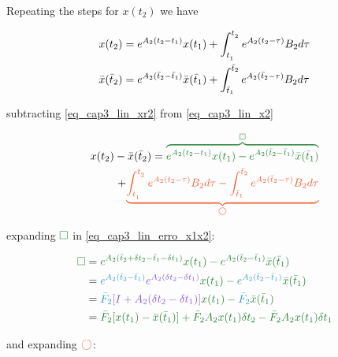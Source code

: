 
Repeating the steps for $x(t_2)$ we have


\noindent
\begin{align}
	\label{eq_cap3_lin_x2}
	x(t_2)  &= e^{A_2(t_2-t_1)}x(t_1) + \int_{t_{_1}}^{t_{_2}} {e^{A_2(t_{2} - \tau)} B_2 d \tau} \\
	\label{eq_cap3_lin_xr2}
	\bar{x}(\bar{t}_2) &= e^{A_2(\bar{t}_2-\bar{t}_1)}\bar{x}(\bar{t}_1) + \int_{\bar{t}_{1}}^{\bar{t}_{2}} {e^{A_{2}(\bar{t}_{2} - \tau)} B_{2} d \tau}
\end{align}

\noindent 
subtracting \eqref{eq_cap3_lin_xr2} from \eqref{eq_cap3_lin_x2} 

\begin{equation}
	\label{eq_cap3_lin_erro_x1x2}
	\begin{split}
		x(t_2) - \bar{x}(\bar{t}_2) = 
		\green{\overbrace{e^{A_2(t_2-t_1)}x(t_1) - e^{A_2(\bar{t}_2-\bar{t}_1)}\bar{x}(\bar{t}_1)}^{\square}} \\ 
		+ \orange{\underbrace{\intlinAA{1}{2}{}{} - \intlinAbtt{1}{2}}_{\bigcirc}}
	\end{split}
\end{equation}

\noindent 
expanding $\green{\square}$ in \eqref{eq_cap3_lin_erro_x1x2}:

\noindent
\begin{align}
	\green{ \square } &=
	\green{
		e^{A_2(\bar{t}_2 + \delta t_2 - \bar{t}_1 - \delta t_1)} x(t_1)
		- e^{A_2(\bar{t}_2 - \bar{t}_1)} \bar{x}(\bar{t}_1)
	} \nonumber \\
	&= \green{
		\blue{\Fri{1}{2}} \purple{e^{A_2(\delta t_2 - \delta t_1)}} x(t_1)
		- \blue{\Fri{1}{2}} \bar{x}(\bar{t}_1)
	} \nonumber \\
	&= \green{
		\blue{\bar{F}_2} \purple{[I + A_2(\delta t_2 - \delta t_1)]} x(t_1)
		- \blue{\bar{F}_2} \bar{x}(\bar{t}_1)
	} \nonumber \\
	\label{eq_cap3_lin_x2_green}
	&= \green{
		\bar{F}_2 [x(t_1) - \bar{x}(\bar{t}_1)] + \bar{F}_2 A_2 x(t_1) \delta t_2
		- \bar{F}_2 A_2 x(t_1) \delta t_1
	}
\end{align}

\noindent 
and expanding $\orange{\bigcirc}$:

